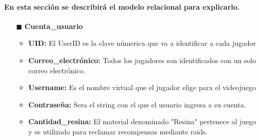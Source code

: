 \documentclass{report}
\begin{document}
\paragraph{En esta sección se describirá el modelo relacional para explicarlo.}
\begin{itemize}
    \item[$\blacksquare$] \textbf{Cuenta\_usuario}
        \begin{itemize}
            \item \textbf {UID: } El UserID es la clave númerica que va a identificar a cada jugador
            \item \textbf{Correo\_electrónico:} Todos los jugadores son identificados con un solo correo electrónico.
            \item \textbf{Username: } Es el nombre virtual que el jugador elige para el videojuego
            \item \textbf{Contraseña: }Sera el string con el que el usuario ingresa a su cuenta.
            \item \textbf{Cantidad\_resina: } El material denominado "Resina" pertenece al juego y es utilizado para reclamar recompensas mediante raids.
            

\end{itemize}
\end{itemize}
\end{document}
